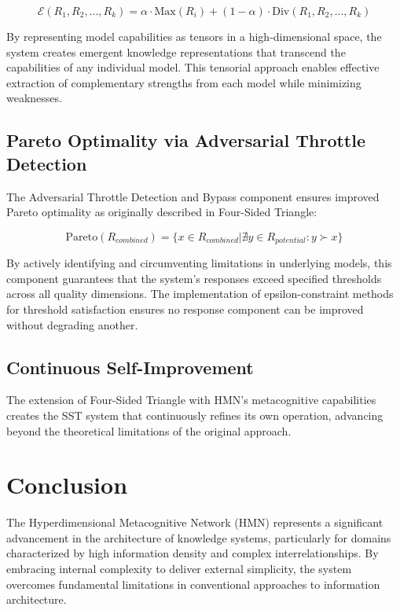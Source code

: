 \documentclass[journal,onecolumn]{IEEEtran}
\begin{document}
\begin{equation}
\mathcal{E}(R_1, R_2, ..., R_k) = \alpha \cdot \text{Max}(R_i) + (1-\alpha) \cdot \text{Div}(R_1, R_2, ..., R_k)
\end{equation}

By representing model capabilities as tensors in a high-dimensional space, the system creates emergent knowledge representations that transcend the capabilities of any individual model. This tensorial approach enables effective extraction of complementary strengths from each model while minimizing weaknesses.

\subsection{Pareto Optimality via Adversarial Throttle Detection}

The Adversarial Throttle Detection and Bypass component ensures improved Pareto optimality as originally described in Four-Sided Triangle:

\begin{equation}
\text{Pareto}(R_{combined}) = \{x \in R_{combined} | \nexists y \in R_{potential}: y \succ x\}
\end{equation}

By actively identifying and circumventing limitations in underlying models, this component guarantees that the system's responses exceed specified thresholds across all quality dimensions. The implementation of epsilon-constraint methods for threshold satisfaction ensures no response component can be improved without degrading another.

\subsection{Continuous Self-Improvement}

The extension of Four-Sided Triangle with HMN's metacognitive capabilities creates the SST system that continuously refines its own operation, advancing beyond the theoretical limitations of the original approach.

\section{Conclusion}

The Hyperdimensional Metacognitive Network (HMN) represents a significant advancement in the architecture of knowledge systems, particularly for domains characterized by high information density and complex interrelationships. By embracing internal complexity to deliver external simplicity, the system overcomes fundamental limitations in conventional approaches to information architecture.
\end{document}
